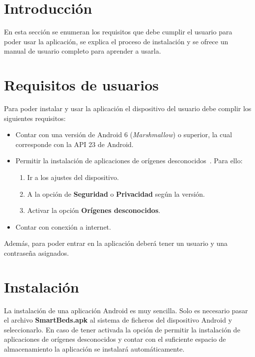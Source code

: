 
\section{Introducción}

En esta sección se enumeran los requisitos que debe cumplir el usuario para poder usar la aplicación, se explica el proceso de instalación y se ofrece un manual de usuario completo para aprender a usarla. 

\section{Requisitos de usuarios}

Para poder instalar y usar la aplicación el dispositivo del usuario debe complir los siguientes requisitos: 

\begin{itemize}
	\item Contar con una versión de Android 6 (\textit{Marshmallow}) o superior, la cual corresponde con la API 23 de Android. 
	\item Permitir la instalación de aplicaciones de orígenes desconocidos~\cite{origenesdesconocidos}. Para ello: 
	\begin{enumerate}
		\item Ir a los ajustes del dispositivo. 
		\item A la opción de \textbf{Seguridad} o \textbf{Privacidad} según la versión. 
		\item Activar la opción \textbf{Orígenes desconocidos}. 
	\end{enumerate}
	\item Contar con conexión a internet. 
\end{itemize}

Además, para poder entrar en la aplicación deberá tener un usuario y una contraseña asignados. 

\section{Instalación}

La instalación de una aplicación Android es muy sencilla. Solo es necesario pasar el archivo \textbf{SmartBeds.apk} al sistema de ficheros del dispositivo Android y seleccionarlo. En caso de tener activada la opción de permitir la instalación de aplicaciones de orígenes desconocidos y contar con el suficiente espacio de almacenamiento la aplicación se instalará automáticamente. 

